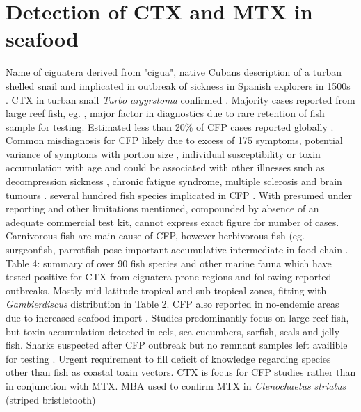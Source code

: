 \documentclass[12pt]{article}
\begin{document}
\section{Detection of CTX and MTX in seafood}
Name of ciguatera derived from "cigua", native Cubans description of a turban shelled snail and implicated in outbreak of sickness in Spanish explorers in 1500s \cite{gudger1930poisonous}. CTX in turban snail \emph{Turbo argyrstoma} confirmed \cite{yasumoto1976toxicity}.
Majority cases reported from large reef fish, eg. \cite{hokama2001ciguatera,lewis2001changing,dechraoui2005use,laurent2005ciguatera}, major factor in diagnostics due to rare retention of fish sample for testing.
Estimated less than 20\% of CFP cases reported globally \cite{dickey2010ciguatera}. Common misdiagnosis for CFP likely due to excess of 175 symptoms\cite{sims1987theoretical}, potential variance of symptoms with portion size \cite{wong2008features}, individual susceptibility or toxin accumulation with age \cite{bagnis1979clinical,glaziou1993study} and could be associated with other illnesses such as decompression sickness \cite{adams1993outbreak}, chronic fatigue syndrome, multiple sclerosis \cite{lindsay1997chronic,ting2001ciguatera} and brain tumours \cite{lindsay1997chronic}.
several hundred fish species implicated in CFP \cite{}. %
With presumed under reporting and other limitations mentioned, compounded by absence of an adequate commercial test kit, cannot express exact figure for number of cases. Carnivorous fish are main cause of CFP, however herbivorous fish (eg. surgeonfish, parrotfish pose important accumulative intermediate in food chain \cite{cruz2006macroalgal,randall1958review}.
Table 4: summary of over 90 fish species and other marine fauna which have tested positive for CTX from ciguatera prone regions and following reported outbreaks. Mostly mid-latitude tropical and sub-tropical zones, fitting with \emph{Gambierdiscus} distribution in Table 2.
CFP also reported in no-endemic areas due to increased seafood import \cite{glaziou1994epidemiology,ting2001ciguatera}. Studies predominantly focus on large reef fish, but toxin accumulation detected in eels, sea cucumbers, sarfish, seals and jelly fish. %
Sharks suspected after CFP outbreak but no remnant samples left availible for testing \cite{boisier1995fatal,lehane2000ciguatera}. Urgent requirement to fill deficit of knowledge regarding species other than fish as coastal toxin vectors.
CTX is focus for CFP studies rather than in conjunction with MTX.
MBA used to confirm MTX in \emph{Ctenochaetus striatus} (striped bristletooth) \cite{bagnis1987use} %
\end{document}
